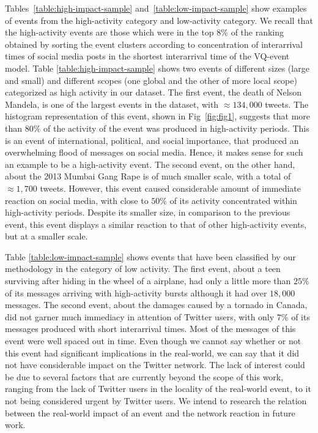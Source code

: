 \documentclass[10pt,letterpaper]{article}
\begin{document}
Tables~\ref{table:high-impact-sample}
and~\ref{table:low-impact-sample} show examples of events from the
high-activity category and low-activity category. We recall that the
high-activity events are those which were in the top 8\% of the
ranking obtained by sorting the event clusters according to
concentration of interarrival times of social media posts in the
shortest interarrival time of the VQ-event model.  Table
\ref{table:high-impact-sample} shows two events of different sizes
(large and small) and different scopes (one global and the other of
more local scope) categorized as high activity in our dataset. The
first event, the death of Nelson Mandela, is one of the largest events
in the dataset, with $\approx 134,000$ tweets. The histogram
representation of this event, shown in Fig~\ref{fig:fig1}, suggests
that more than $80\%$ of the activity of the event was produced in
high-activity periods.  This is an event of international, political,
and social importance, that produced an overwhelming flood of messages
on social media. %
Hence, it makes
sense for such an example to be a high-activity event.  The second
event, on the other hand, about the 2013 Mumbai Gang Rape is of much
smaller scale, with a total of $\approx 1,700$ tweets.  However, this
event caused considerable amount of immediate reaction on social
media, with close to $50\%$ of its activity concentrated within
high-activity periods. Despite its smaller size, in comparison to the
previous event, this event displays a similar reaction to that of
other high-activity events, but at a smaller scale. 

Table \ref{table:low-impact-sample} shows events that have been
classified by our methodology in the category of low activity.  The
first event, about a teen surviving after hiding in the wheel of a
airplane, had only a little more than $25\%$ of its messages arriving
with high-activity bursts although it had over $18,000$ messages.  The
second event, about the damages caused by a tornado in Canada, did not
garner much immediacy in attention of Twitter users, with only $7\%$
of its messages produced with short interarrival times. Most of the
messages of this event were well spaced out in time. Even though we
cannot say whether or not this event had significant implications in
the real-world, we can say that it did not have considerable impact on
the Twitter network. The lack of interest could be due to several
factors that are currently beyond the scope of this work, ranging from
the lack of Twitter users in the locality of the real-world event, to
it not being considered urgent by Twitter users. We intend to research
the relation between the real-world impact of an event and the network
reaction in future work.
\end{document}
